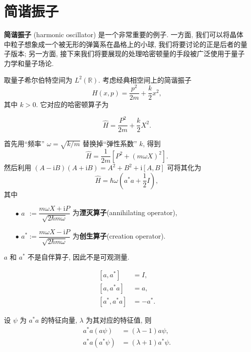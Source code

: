 \section{简谐振子}
\label{harmonic oscillator}
{\bf 简谐振子} (harmonic oscillator) 是一个非常重要的例子. 一方面, 我们可以将晶体中粒子想象成一个被无形的弹簧系在晶格上的小球, 我们将要讨论的正是后者的量子版本; 另一方面, 接下来我们将要展现的处理哈密顿量的手段被广泛使用于量子力学和量子场论.

取量子希尔伯特空间为 $ L^2(\mathbb{R}) $. 考虑经典相空间上的简谐振子
\[ H(x,p)=\frac{p^2}{2m}+\frac{k}{2}x^2, \]
其中 $ k>0 $. 它对应的哈密顿算子为

\[ \hat{H}=\frac{P^2}{2m}+\frac{k}{2}X^2. \]

首先用``频率'' $ \omega=\sqrt{k/m} $ 替换掉``弹性系数'' $ k $, 得到
\[ \hat{H}=\frac{1}{2m}\left[ P^2+(m\omega X)^2 \right]. \]
然后利用 $ (A-\mathrm{i}B)(A+\mathrm{i}B)=A^2+B^2+\mathrm{i}[A,B] $ 可将其化为
\[ \hat{H}=\hbar\omega\left(a^*a+\frac{1}{2}I\right), \]
其中
\begin{enumerate}
    \item[$ \bullet $] $ a\phantom{{}^*}:=\dfrac{m\omega X+\mathrm{i}P}{\sqrt{2\hbar m\omega}} $ 为{\bf 湮灭算子}(annihilating operator),
    \item[$ \bullet $] $ a^*:=\dfrac{m\omega X-\mathrm{i}P}{\sqrt{2\hbar m\omega}} $ 为{\bf 创生算子}(creation operator).
\end{enumerate}

\begin{remark}
    $ a $ 和 $ a^* $ 不是自伴算子, 因此不是可观测量.
\end{remark}

\begin{proposition}\keepline
    \[\begin{aligned}
        [a,a^*] &= I,\\ 
        [a,a^*a] &= a,\\ 
        [a^*,a^*a] &= -a^*.
    \end{aligned}\]
\end{proposition}
\begin{proposition}
    设 $ \psi $ 为 $ a^*a $ 的特征向量, $ \lambda $ 为其对应的特征值, 则
    \begin{align*}
        a^*a(a\psi)&=(\lambda-1)a\psi,\\ 
        a^*a(a^*\psi)&=(\lambda+1)a^*\psi.
    \end{align*}
\end{proposition}

